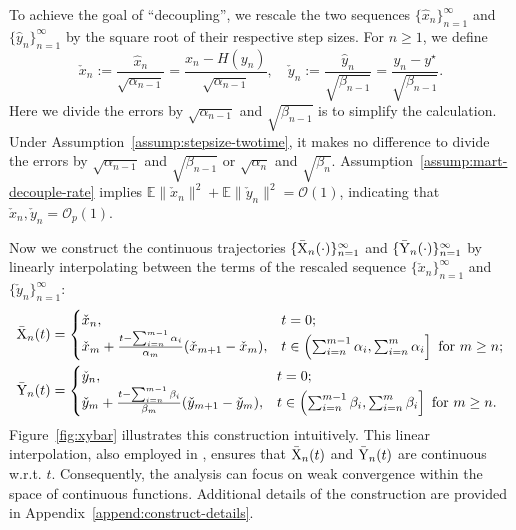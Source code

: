 \documentclass[11pt]{article}
\theoremstyle{plain}
\theoremstyle{definition}
\def\Figref#1{Figure~\ref{#1}}
\def\OM{{\mathcal O}}
\def\EB{{\mathbb E}}
\newcommand{\xhat}{{\hat{x}}}
\newcommand{\yhat}{{\hat{y}}}
\newcommand{\xcheck}{{\check{x}}}
\newcommand{\ycheck}{{\check{y}}}
\newcommand{\xbar}{{\bar{\textnormal{X}}}}
\newcommand{\ybar}{{\bar{\textnormal{Y}}}}
\newcommand{\xx}{{x}}
\newcommand{\yy}{{y}}
\begin{document}
To achieve the goal of ``decoupling'',
we rescale the two sequences $\{ \xhat_{n} \}_{n=1}^\infty$ and $\{ \yhat_{n} \}_{n=1}^\infty$ by the square root of their respective step sizes.
For $n \ge 1$, we define
\begin{equation}\label{eq:xycheck-def}
    \xcheck_{n} := \frac{\xhat_{n}}{ \sqrt{ \alpha_{n-1}} } = \frac{ \xx_n - H(\yy_n) }{ \sqrt{\alpha_{n-1}} }, \quad 
    \ycheck_{n} := \frac{ \yhat_{n} }{ \sqrt{\beta_{n-1}}  } = \frac{ \yy_{n} - \yy^\star }{ \sqrt{ \beta_{n-1} } }.
\end{equation}
Here we divide the errors by $\sqrt{\alpha_{n-1}}$ and $\sqrt{\beta_{n-1}}$ is to simplify the calculation. Under Assumption~\ref{assump:stepsize-twotime}, it makes no difference to divide the errors by  $\sqrt{\alpha_{n-1}}$ and $\sqrt{\beta_{n-1}}$ or $\sqrt{\alpha_{n}}$ and $\sqrt{\beta_{n}}$.
Assumption~\ref{assump:mart-decouple-rate} implies $ \EB \| \xcheck_{n} \|^2 + \EB \| \ycheck_{n} \|^2 = \OM(1) $, indicating that $\xcheck_{n}, \ycheck_{n} = \OM_p(1)$.


Now we construct the continuous trajectories $\{ \xbar_{n}(\cdot) \}_{n=1}^\infty$ and $\{ \ybar_{n}(\cdot) \}_{n=1}^\infty$ by linearly interpolating between the terms of the rescaled sequence $\{ \xcheck_{n} \}_{n=1}^\infty$ and $\{ \ycheck_{n} \}_{n=1}^\infty$:
\begin{align}
	\label{eq:xbar-short}
	\xbar_{n}(t) & = \begin{cases}
		\xcheck_{n}, &  t = 0; \\
		\xcheck_{m} + \frac{t - \sum_{i=n}^{m-1} \alpha_{i} }{\alpha_{m}} (\xcheck_{m+1} - \xcheck_{m}), & t \in \left( \sum_{i=n}^{m-1} \alpha_{i}, \sum_{i=n}^{m} \alpha_{i} \right] \text{ for } m \ge n;
	\end{cases} \\
	\label{eq:ybar-short}
	\ybar_{n}(t) & = \begin{cases}
		\ycheck_{n}, &  t = 0; \\
		\ycheck_{m} + \frac{t - \sum_{i=n}^{m-1} \beta_{i} }{\beta_{m}} (\ycheck_{m+1} - \ycheck_{m}), & t \in \left( \sum_{i=n}^{m-1} \beta_{i}, \sum_{i=n}^{m} \beta_{i} \right] \text{ for } m \ge n.
	\end{cases} 
\end{align}
\Figref{fig:xybar} illustrates this construction intuitively.
This linear interpolation, also employed in \cite{faizal2023functional}, ensures that
$\xbar_{n}(t)$ and $\ybar_{n}(t)$ are continuous w.r.t. $t$. Consequently, the analysis can focus on weak convergence within the space of continuous functions. Additional details of the construction are provided in Appendix~\ref{append:construct-details}.
\end{document}
